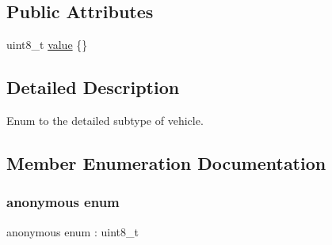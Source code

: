 \subsection*{Public Attributes}
\begin{DoxyCompactItemize}
\item 
uint8\+\_\+t \hyperlink{structmaf__perception__interface_1_1VehicleSubTypeEnum_ae2ca7c694c68a914781325efa0d80898}{value} \{\}
\end{DoxyCompactItemize}


\subsection{Detailed Description}
Enum to the detailed subtype of vehicle. 

\subsection{Member Enumeration Documentation}
\mbox{\label{structmaf__perception__interface_1_1VehicleSubTypeEnum_a19106d134265559f3d1b8cdd26955ed2}} 
\subsubsection{\texorpdfstring{anonymous enum}{anonymous enum}}
{\footnotesize\ttfamily anonymous enum \+: uint8\+\_\+t}

